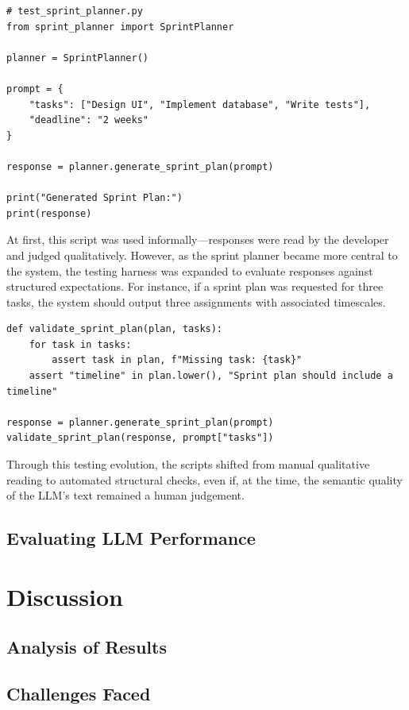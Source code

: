 \documentclass{report}
\begin{document}
\begin{lstlisting}
# test_sprint_planner.py
from sprint_planner import SprintPlanner

planner = SprintPlanner()

prompt = {
    "tasks": ["Design UI", "Implement database", "Write tests"],
    "deadline": "2 weeks"
}

response = planner.generate_sprint_plan(prompt)

print("Generated Sprint Plan:")
print(response)

\end{lstlisting} 
At first, this script was used informally—responses were read by the developer and judged qualitatively. However, as the sprint planner became more central to the system, the testing harness was expanded to evaluate responses against structured expectations. For instance, if a sprint plan was requested for three tasks, the system should output three assignments with associated timescales.

\begin{lstlisting}
def validate_sprint_plan(plan, tasks):
    for task in tasks:
        assert task in plan, f"Missing task: {task}"
    assert "timeline" in plan.lower(), "Sprint plan should include a timeline"

response = planner.generate_sprint_plan(prompt)
validate_sprint_plan(response, prompt["tasks"])
\end{lstlisting} 
Through this testing evolution, the scripts shifted from manual qualitative reading to automated structural checks, even if, at the time, the semantic quality of the LLM's text remained a human judgement.
\section{Evaluating LLM Performance}






\chapter{Discussion}  %
\section{Analysis of Results}
\section{Challenges Faced}
\end{document}
